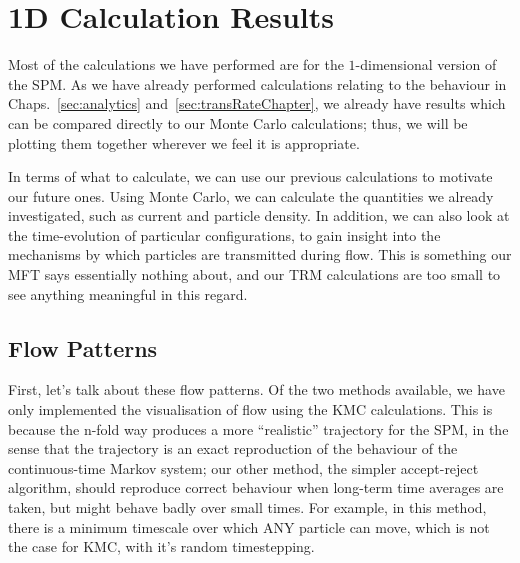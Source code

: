 \section{1D Calculation Results}
Most of the calculations we have performed are for the $1$-dimensional version of the SPM. As we 
have already performed calculations relating to the behaviour in Chaps.~\ref{sec:analytics}
and~\ref{sec:transRateChapter}, we already have results which can be compared directly to our
Monte Carlo calculations; thus, we will be plotting them together wherever we feel it is
appropriate.

In terms of what to calculate, we can use our previous calculations to motivate our future ones.
Using Monte Carlo, we can calculate the quantities we already investigated, such as current and 
particle density. In addition, we can also look at the time-evolution of particular configurations,
to gain insight into the mechanisms by which particles are transmitted during flow. This is
something our MFT says essentially nothing about, and our TRM calculations are too small to see 
anything meaningful in this regard.

\subsection{Flow Patterns} \label{sec:flowPatternVis}

First, let's talk about these flow patterns. Of the two methods available, we have only implemented
the visualisation of flow using the KMC calculations. This is because the n-fold way produces
a more ``realistic'' trajectory for the SPM, in the sense that the trajectory is an exact 
reproduction of the behaviour of the continuous-time Markov system; our other method, the simpler
accept-reject algorithm, should reproduce correct behaviour when long-term time averages are taken,
but might behave badly over small times. For example, in this method, there is a minimum timescale
over which ANY particle can move, which is not the case for KMC, with it's random timestepping.

